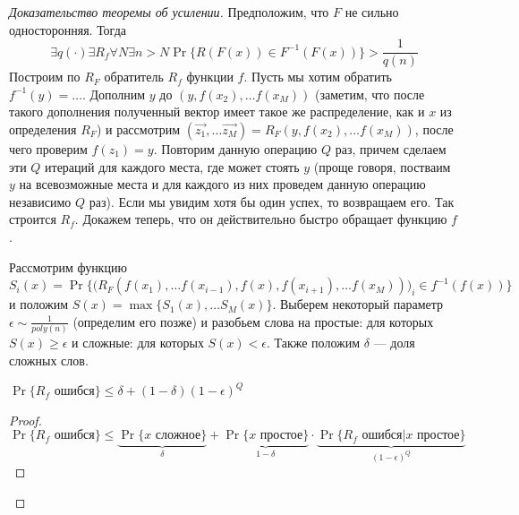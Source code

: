 \begin{proof}[Доказательство теоремы об усилении]
    Предположим, что \(F\) не сильно односторонняя. Тогда 
    \[\exists q(\cdot) \exists R_f \forall N \exists n > N \Pr\{R(F(x)) \in F^{-1}(F(x))\} > \frac{1}{q(n)}\]
    Построим по \(R_F\) обратитель \(R_f\) функции \(f\). Пусть мы хотим обратить \(f^{-1}(y) = \dots\). Дополним \(y\) до \((y, f(x_2), \dots f(x_M))\) (заметим, что после такого дополнения полученный вектор имеет такое же распределение, как и \(x\) из определения \(R_F\)) и рассмотрим \((\vec{z_1}, \dots \vec{z_M}) = R_F(y, f(x_2), \dots f(x_M))\), после чего проверим \(f(z_1) = y\). Повторим данную операцию \(Q\) раз, причем сделаем эти \(Q\) итераций для каждого места, где может стоять \(y\) (проще говоря, постваим \(y\) на всевозможные места и для каждого из них проведем данную операцию независимо \(Q\) раз). Если мы увидим хотя бы один успех, то возвращаем его. Так строится \(R_f\). Докажем теперь, что он действительно быстро обращает функцию \(f\).

    Рассмотрим функцию \(S_i(x) = \Pr\bigg\{\big(R_F(f(x_1), \dots f(x_{i - 1}), f(x), f(x_{i + 1}), \dots f(x_M))\big)_i \in f^{-1}(f(x))\bigg\}\) и положим \(S(x) = \max \{S_1(x), \dots S_M(x)\}\). Выберем некоторый параметр \(\epsilon \sim \frac{1}{poly(n)}\) (определим его позже) и разобьем слова на простые: для которых \(S(x) \ge \epsilon\) и сложные: для которых \(S(x) < \epsilon\). Также положим \(\delta\) --- доля сложных слов.

    \begin{lemma}
        \(\Pr \{R_f\text{ ошибся}\} \le \delta + (1 - \delta)(1 - \epsilon)^Q\)
    \end{lemma}
    \begin{proof}
        \[\Pr \{R_f\text{ ошибся}\} \le \underbrace{\Pr\{x\text{ сложное}\}}_\delta + \underbrace{\Pr\{x\text{ простое}\}}_{1 - \delta} \cdot \underbrace{\Pr\{R_f\text{ ошибся} | x\text{ простое}\}}_{(1 - \epsilon)^Q}\]
    \end{proof}


\end{proof}
